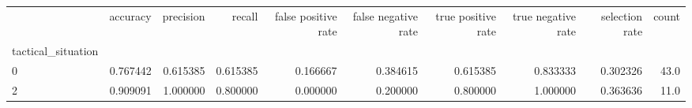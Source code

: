 \begin{tabular}{lrrrrrrrrr}
\toprule
{} &  accuracy &  precision &    recall &  false positive rate &  false negative rate &  true positive rate &  true negative rate &  selection rate &  count \\
tactical\_situation &           &            &           &                      &                      &                     &                     &                 &        \\
\midrule
0                  &  0.767442 &   0.615385 &  0.615385 &             0.166667 &             0.384615 &            0.615385 &            0.833333 &        0.302326 &   43.0 \\
2                  &  0.909091 &   1.000000 &  0.800000 &             0.000000 &             0.200000 &            0.800000 &            1.000000 &        0.363636 &   11.0 \\
\bottomrule
\end{tabular}
